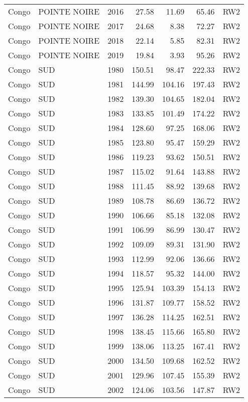 \begin{longtable}{lllrrrl}
  Congo & POINTE NOIRE & 2016 & 27.58 & 11.69 & 65.46 & RW2 \\ 
  Congo & POINTE NOIRE & 2017 & 24.68 & 8.38 & 72.27 & RW2 \\ 
  Congo & POINTE NOIRE & 2018 & 22.14 & 5.85 & 82.31 & RW2 \\ 
  Congo & POINTE NOIRE & 2019 & 19.84 & 3.93 & 95.26 & RW2 \\ 
  Congo & SUD & 1980 & 150.51 & 98.47 & 222.33 & RW2 \\ 
  Congo & SUD & 1981 & 144.99 & 104.16 & 197.43 & RW2 \\ 
  Congo & SUD & 1982 & 139.30 & 104.65 & 182.04 & RW2 \\ 
  Congo & SUD & 1983 & 133.85 & 101.49 & 174.22 & RW2 \\ 
  Congo & SUD & 1984 & 128.60 & 97.25 & 168.06 & RW2 \\ 
  Congo & SUD & 1985 & 123.80 & 95.47 & 159.29 & RW2 \\ 
  Congo & SUD & 1986 & 119.23 & 93.62 & 150.51 & RW2 \\ 
  Congo & SUD & 1987 & 115.02 & 91.64 & 143.88 & RW2 \\ 
  Congo & SUD & 1988 & 111.45 & 88.92 & 139.68 & RW2 \\ 
  Congo & SUD & 1989 & 108.78 & 86.69 & 136.72 & RW2 \\ 
  Congo & SUD & 1990 & 106.66 & 85.18 & 132.08 & RW2 \\ 
  Congo & SUD & 1991 & 106.99 & 86.99 & 130.47 & RW2 \\ 
  Congo & SUD & 1992 & 109.09 & 89.31 & 131.90 & RW2 \\ 
  Congo & SUD & 1993 & 112.99 & 92.06 & 136.66 & RW2 \\ 
  Congo & SUD & 1994 & 118.57 & 95.32 & 144.00 & RW2 \\ 
  Congo & SUD & 1995 & 125.94 & 103.39 & 154.13 & RW2 \\ 
  Congo & SUD & 1996 & 131.87 & 109.77 & 158.52 & RW2 \\ 
  Congo & SUD & 1997 & 136.28 & 114.25 & 162.51 & RW2 \\ 
  Congo & SUD & 1998 & 138.45 & 115.66 & 165.80 & RW2 \\ 
  Congo & SUD & 1999 & 138.06 & 113.25 & 167.41 & RW2 \\ 
  Congo & SUD & 2000 & 134.50 & 109.68 & 162.52 & RW2 \\ 
  Congo & SUD & 2001 & 129.96 & 107.45 & 155.39 & RW2 \\ 
  Congo & SUD & 2002 & 124.06 & 103.56 & 147.87 & RW2 \\ 

\end{longtable}
